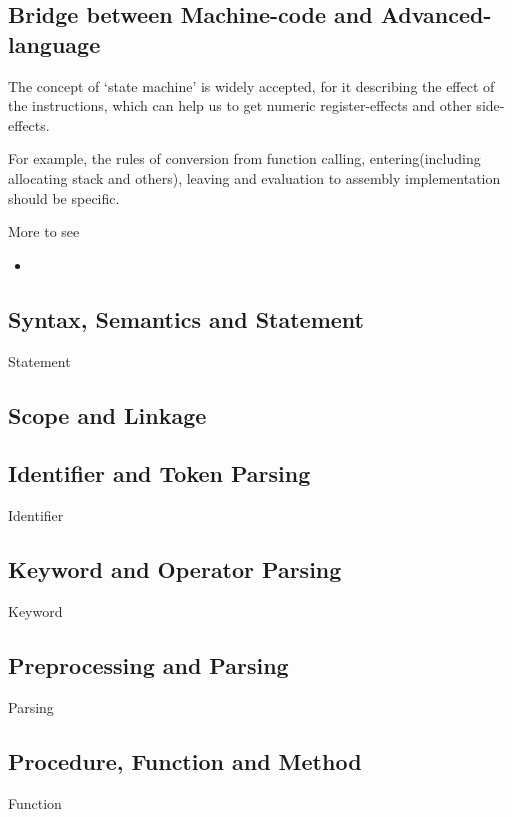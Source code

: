 
\subsection{Bridge between Machine-code and Advanced-language}

The concept of `state machine' is widely accepted, for it describing the effect of the instructions, which can help us to get numeric register-effects and other side-effects.

For example, the rules of conversion from function calling, entering(including allocating stack and others), leaving and evaluation to assembly implementation should be specific.

More to see
\begin{itemize}
	\item {}
\end{itemize}

\subsection{Syntax, Semantics and Statement} %
{Statement}

\subsection{Scope and Linkage}

\subsection{Identifier and Token Parsing}
{Identifier}

\subsection{Keyword and Operator Parsing}
{Keyword}


\subsection{Preprocessing and Parsing}
{Parsing}

\subsection{Procedure, Function and Method}
{Function}

